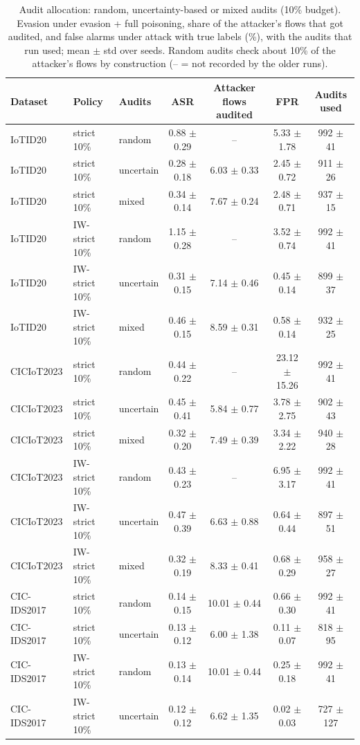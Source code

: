 \begin{table}[t]
\centering
\caption{Audit allocation: random, uncertainty-based or mixed audits (10\% budget). Evasion under evasion + full poisoning, share of the attacker's flows that got audited, and false alarms under attack with true labels (\%), with the audits that run used; mean $\pm$ std over seeds. Random audits check about 10\% of the attacker's flows by construction (-- = not recorded by the older runs).}
\label{tab:audits}
\footnotesize
\setlength{\tabcolsep}{3pt}
\begin{tabular}{lllcccc}
\toprule
Dataset & Policy & Audits & ASR & Attacker flows audited & FPR & Audits used \\
\midrule
IoTID20 & strict 10\% & random & 0.88 $\pm$ 0.29 & -- & 5.33 $\pm$ 1.78 & 992 $\pm$ 41 \\
IoTID20 & strict 10\% & uncertain & 0.28 $\pm$ 0.18 & 6.03 $\pm$ 0.33 & 2.45 $\pm$ 0.72 & 911 $\pm$ 26 \\
IoTID20 & strict 10\% & mixed & 0.34 $\pm$ 0.14 & 7.67 $\pm$ 0.24 & 2.48 $\pm$ 0.71 & 937 $\pm$ 15 \\
IoTID20 & IW-strict 10\% & random & 1.15 $\pm$ 0.28 & -- & 3.52 $\pm$ 0.74 & 992 $\pm$ 41 \\
IoTID20 & IW-strict 10\% & uncertain & 0.31 $\pm$ 0.15 & 7.14 $\pm$ 0.46 & 0.45 $\pm$ 0.14 & 899 $\pm$ 37 \\
IoTID20 & IW-strict 10\% & mixed & 0.46 $\pm$ 0.15 & 8.59 $\pm$ 0.31 & 0.58 $\pm$ 0.14 & 932 $\pm$ 25 \\
CICIoT2023 & strict 10\% & random & 0.44 $\pm$ 0.22 & -- & 23.12 $\pm$ 15.26 & 992 $\pm$ 41 \\
CICIoT2023 & strict 10\% & uncertain & 0.45 $\pm$ 0.41 & 5.84 $\pm$ 0.77 & 3.78 $\pm$ 2.75 & 902 $\pm$ 43 \\
CICIoT2023 & strict 10\% & mixed & 0.32 $\pm$ 0.20 & 7.49 $\pm$ 0.39 & 3.34 $\pm$ 2.22 & 940 $\pm$ 28 \\
CICIoT2023 & IW-strict 10\% & random & 0.43 $\pm$ 0.23 & -- & 6.95 $\pm$ 3.17 & 992 $\pm$ 41 \\
CICIoT2023 & IW-strict 10\% & uncertain & 0.47 $\pm$ 0.39 & 6.63 $\pm$ 0.88 & 0.64 $\pm$ 0.44 & 897 $\pm$ 51 \\
CICIoT2023 & IW-strict 10\% & mixed & 0.32 $\pm$ 0.19 & 8.33 $\pm$ 0.41 & 0.68 $\pm$ 0.29 & 958 $\pm$ 27 \\
CIC-IDS2017 & strict 10\% & random & 0.14 $\pm$ 0.15 & 10.01 $\pm$ 0.44 & 0.66 $\pm$ 0.30 & 992 $\pm$ 41 \\
CIC-IDS2017 & strict 10\% & uncertain & 0.13 $\pm$ 0.12 & 6.00 $\pm$ 1.38 & 0.11 $\pm$ 0.07 & 818 $\pm$ 95 \\
CIC-IDS2017 & IW-strict 10\% & random & 0.13 $\pm$ 0.14 & 10.01 $\pm$ 0.44 & 0.25 $\pm$ 0.18 & 992 $\pm$ 41 \\
CIC-IDS2017 & IW-strict 10\% & uncertain & 0.12 $\pm$ 0.12 & 6.62 $\pm$ 1.35 & 0.02 $\pm$ 0.03 & 727 $\pm$ 127 \\
\bottomrule
\end{tabular}
\end{table}
